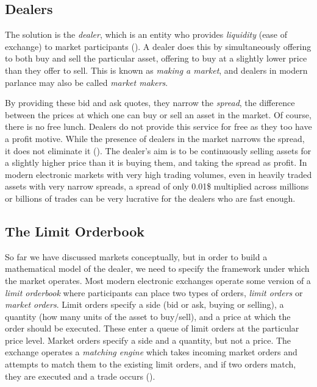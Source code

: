 \subsection*{Dealers} 
The solution is the \textit{dealer}, which is an entity who provides \textit{liquidity}
(ease of exchange) to market participants (\cite{trading}). A dealer does this by 
simultaneously offering to both buy and sell the particular asset, offering to buy at a 
slightly lower price than they offer to sell. This is known as \emph{making a market}, and 
dealers in modern parlance may also be called \emph{market makers}.

By providing these bid and ask quotes, they narrow the \textit{spread}, the difference 
between the prices at which one can buy or sell an asset in the market. 
Of course, there is no free lunch. Dealers do not provide this service for free as they 
too have a profit motive. While the presence of dealers in the market narrows the spread, 
it does not eliminate it (\cite{trading}). 
The dealer's aim is to be continuously selling assets for a slightly higher price 
than it is buying them, and taking the spread as profit. In modern electronic markets 
with very high trading volumes, even in heavily traded assets with very narrow 
spreads, a spread of only 0.01\$ multiplied across millions or billions of trades 
can be very lucrative for the dealers who are fast enough.

\subsection*{The Limit Orderbook}
So far we have discussed markets conceptually, but in order to build a 
mathematical model of the dealer, we need to specify the framework under which the 
market operates. Most modern electronic exchanges 
operate some version of a \textit{limit orderbook} where participants can place two 
types of orders, \textit{limit orders} or \textit{market orders}. 
Limit orders specify a side (bid or ask, buying or selling), a quantity (how 
many units of the asset to buy/sell), and a price at which the order should be 
executed. These enter a queue of limit orders at the particular price level. Market 
orders specify a side and a quantity, but not a price. The exchange operates a 
\textit{matching engine} which takes incoming market orders and attempts to match 
them to the existing limit orders, and if two orders match, they are executed and a 
trade occurs (\cite{trading}). 

